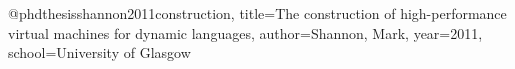 @phdthesis{shannon2011construction,
    title={The construction of high-performance virtual machines for dynamic languages},
    author={Shannon, Mark},
    year=2011,
    school={University of Glasgow}
}